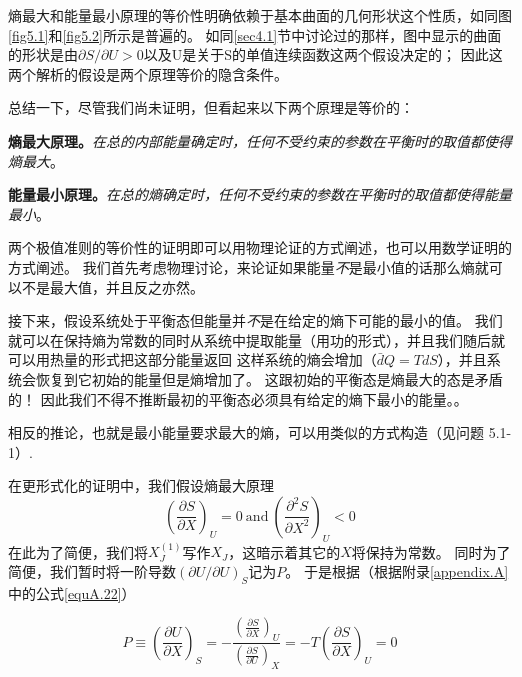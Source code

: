 熵最大和能量最小原理的等价性明确依赖于基本曲面的几何形状这个性质，如同图\ref{fig5.1}和\ref{fig5.2}所示是普遍的。
如同\ref{sec4.1}节中讨论过的那样，图中显示的曲面的形状是由$\partial S/\partial U>0$以及U是关于S的单值连续函数这两个假设决定的；
因此这两个解析的假设是两个原理等价的隐含条件。

总结一下，尽管我们尚未证明，但看起来以下两个原理是等价的：

{\bf 熵最大原理。}{\it 在总的内部能量确定时，任何不受约束的参数在平衡时的取值都使得熵最大}。

{\bf 能量最小原理。}{\it 在总的熵确定时，任何不受约束的参数在平衡时的取值都使得能量最小}。

两个极值准则的等价性的证明即可以用物理论证的方式阐述，也可以用数学证明的方式阐述。
我们首先考虑物理讨论，来论证如果能量{\it 不}是最小值的话那么熵就可以不是最大值，并且反之亦然。

接下来，假设系统处于平衡态但能量并{\it 不}是在给定的熵下可能的最小的值。
我们就可以在保持熵为常数的同时从系统中提取能量（用功的形式），并且我们随后就可以用热量的形式把这部分能量返回
这样系统的熵会增加（$\bar{d}Q=TdS$），并且系统会恢复到它初始的能量但是熵增加了。
这跟初始的平衡态是熵最大的态是矛盾的！
因此我们不得不推断最初的平衡态必须具有给定的熵下最小的能量。。

相反的推论，也就是最小能量要求最大的熵，可以用类似的方式构造（见问题 5.1-1）.

在更形式化的证明中，我们假设熵最大原理
\begin{equation}
\label{equ5.1}
\left(\frac{\partial S}{\partial X}\right)_U=0
~\text{and}~
\left(\frac{\partial^2 S}{\partial X^2}\right)_U<0
\end{equation}
在此为了简便，我们将$X_J^{(1)}$写作$X_J$，这暗示着其它的$X$将保持为常数。
同时为了简便，我们暂时将一阶导数$(\partial U/\partial U)_S$记为$P$。
于是根据（根据附录\ref{appendix.A}中的公式\eqref{equA.22}）

\begin{equation}
\label{equ5.2}
P\equiv\left(\frac{\partial U}{\partial X}\right)_S
=-\frac{\left(\frac{\partial S}{\partial X}\right)_U}{\left(\frac{\partial S}{\partial U}\right)_X}
=-T\left(\frac{\partial S}{\partial X}\right)_U=0
\end{equation}

